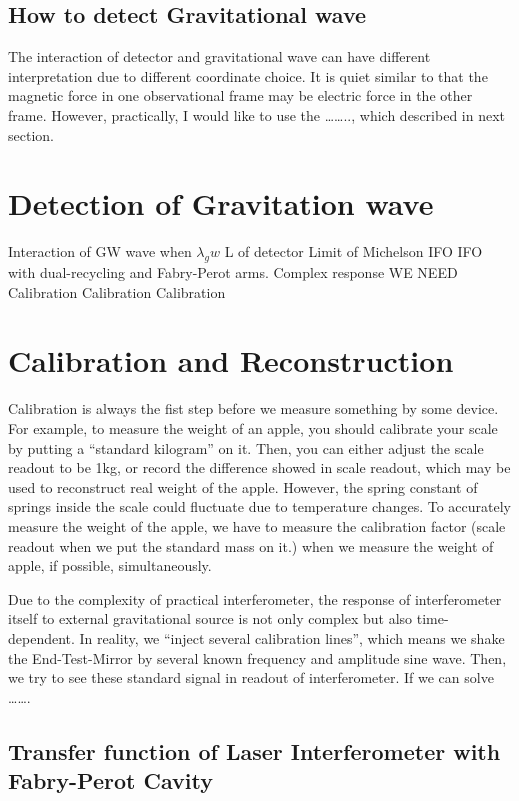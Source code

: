 \subsection{How to detect Gravitational wave}
The interaction of detector and gravitational wave can have different interpretation due to different coordinate choice\cite{ifo:gauge}. It is quiet similar to that the magnetic force in one observational frame may be electric force in the other frame. However, practically, I would like to use the …….., which described in next section.


\section{Detection of Gravitation wave}

Interaction of GW wave when $\lambda_gw$ L of detector
Limit of Michelson IFO
IFO with dual-recycling and Fabry-Perot  arms.
 Complex response
WE NEED Calibration Calibration Calibration



\section{Calibration and Reconstruction}

Calibration is always the fist step before we measure something by some device.
For example, to measure the weight of an apple, you should calibrate your scale by putting a “standard kilogram” on it. Then, you can either adjust the scale readout to be 1kg, or record the difference showed in scale readout, which may be used to reconstruct real weight of the apple. However, the spring constant of springs inside the scale could fluctuate due to temperature changes. To accurately measure the weight of the apple, we have to measure the calibration factor (scale readout when we put the standard mass on it.) when we measure the weight of apple, if possible, simultaneously.

Due to the complexity of practical interferometer, the response of interferometer itself to external gravitational source is not only complex but also time-dependent. In reality, we “inject several calibration lines”, which means we shake the End-Test-Mirror by several known frequency and amplitude sine wave. Then, we try to see these standard signal in readout of interferometer. If we can solve 
……. 


\subsection{Transfer function of Laser Interferometer with Fabry-Perot Cavity}
